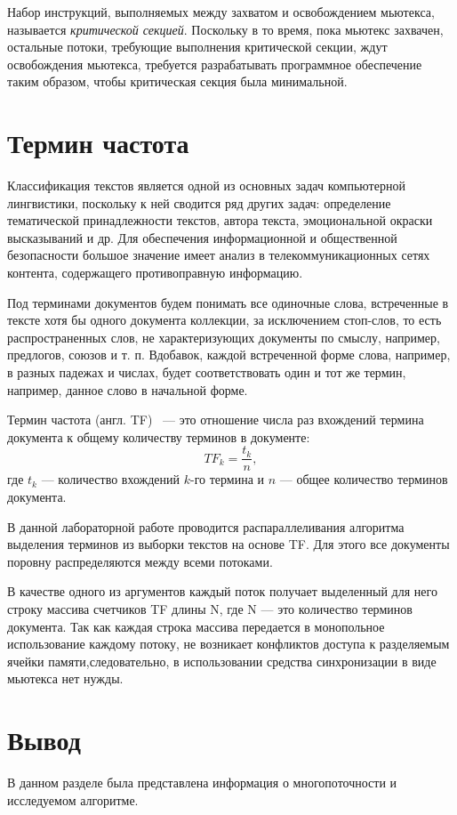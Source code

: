Набор инструкций, выполняемых между захватом и освобождением мьютекса, называется \textit{критической секцией}. 
Поскольку в то время, пока мьютекс захвачен, остальные потоки, требующие выполнения критической секции, ждут освобождения мьютекса, требуется разрабатывать программное обеспечение таким образом, чтобы критическая секция была минимальной.

\section{Термин частота}

Классификация текстов является одной из основных задач компьютерной лингвистики, поскольку к ней сводится ряд других задач: определение тематической принадлежности текстов, автора текста, эмоциональной окраски высказываний и др. Для обеспечения информационной и общественной безопасности большое значение имеет анализ в телекоммуникационных сетях контента, содержащего противоправную информацию.~\cite{avto_lingv}

Под терминами документов будем понимать все одиночные слова, встреченные в тексте хотя бы одного документа коллекции, за исключением стоп-слов, то есть распространенных слов, не характеризующих документы по смыслу, например, предлогов, союзов и т. п. Вдобавок, каждой встреченной форме слова, например, в разных падежах и числах, будет соответствовать один и тот же термин, например, данное слово в начальной форме.

Термин частота (англ. TF)~\cite{lingv} --- это отношение числа раз вхождений термина документа к общему количеству терминов в документе:
\begin{equation}
	TF_k = \frac{t_k}{n},
\end{equation}
где $t_k$ --- количество вхождений $k$-го термина и $n$ --- общее количество терминов документа.

В данной лабораторной работе проводится распараллеливания алгоритма выделения терминов из выборки текстов на основе TF. Для этого все документы поровну распределяются между всеми потоками.

В качестве одного из аргументов каждый поток получает выделенный для него строку массива счетчиков TF длины N, где N — это количество терминов документа. Так как каждая строка массива передается в монопольное использование каждому
потоку, не возникает конфликтов доступа к разделяемым ячейки памяти,следовательно, в использовании средства синхронизации в виде мьютекса нет нужды.

\section*{Вывод}
В данном разделе была представлена информация о многопоточности и исследуемом алгоритме.
